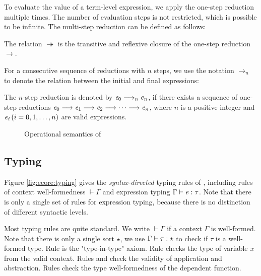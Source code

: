 To evaluate the value of a term-level expression, we apply the
one-step reduction multiple times. The number of evaluation steps is
not restricted, which is possible to be infinite. The multi-step
reduction can be defined as follows:

\begin{dfn}
    The relation $ \twoheadrightarrow $ is the transitive and reflexive closure of
    the one-step reduction $ \longrightarrow $.
\end{dfn}

For a consecutive sequence of reductions
with $n$ steps, we use the notation $ \longrightarrow_n $ to denote the relation
between the initial and final expressions:

\begin{dfn}
    The $n$-step reduction is denoted by $\mathit{e_{{\mathrm{0}}}}  \longrightarrow_n  \mathit{e_{\mathit{n}}}$, if
    there exists a sequence of one-step reductions $\mathit{e_{{\mathrm{0}}}}  \longrightarrow 
    \mathit{e_{{\mathrm{1}}}}  \longrightarrow  \mathit{e_{{\mathrm{2}}}}  \longrightarrow  \dots  \longrightarrow  \mathit{e_{\mathit{n}}}$, where $n$ is
    a positive integer and $\mathit{e_{\mathit{i}}}\,(i=0,1,\dots,n)$ are valid
    expressions.
\end{dfn}

\begin{figure}
    \ottdefnstep{}
    \caption{Operational semantics of \ecore}
    \label{fig:ecore:opsem}
\end{figure}

\subsection{Typing}\label{sec:ecore:type}

Figure \ref{fig:ecore:typing} gives the \emph{syntax-directed} typing
rules of \ecore, including rules of context well-formedness $\vdash  \Gamma$
and expression typing $\Gamma  \vdash  \mathit{e}  :  \tau$. Note that there is only a
single set of rules for expression typing, because there is no
distinction of different syntactic levels.

Most typing rules are quite standard. We write $\vdash  \Gamma$ if a context
$\Gamma$ is well-formed. Note that there is only a single sort
$\star$, we use $\Gamma  \vdash  \tau  :  \star$ to check if $\tau$ is a
well-formed type. Rule  is the "type-in-type"
axiom. Rule  checks the type of variable $\mathit{x}$ from
the valid context. Rules  and  check
the validity of application and abstraction. Rules 
check the type well-formedness of the dependent function.

